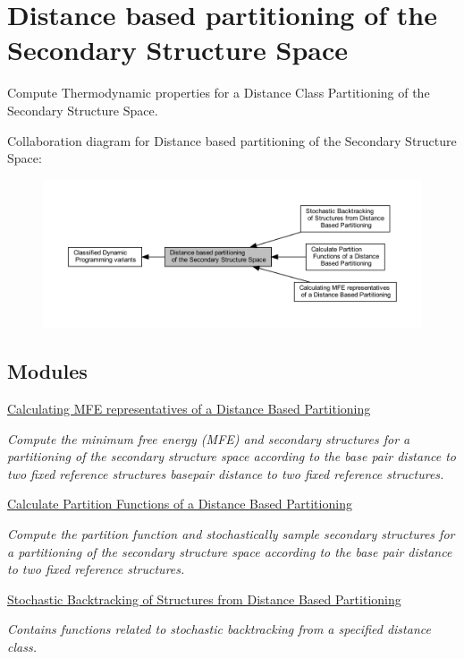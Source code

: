 \hypertarget{group__kl__neighborhood}{}\section{Distance based partitioning of the Secondary Structure Space}
\label{group__kl__neighborhood}


Compute Thermodynamic properties for a Distance Class Partitioning of the Secondary Structure Space.  


Collaboration diagram for Distance based partitioning of the Secondary Structure Space\+:
\nopagebreak
\begin{figure}[H]
\begin{center}
\leavevmode
\includegraphics[width=350pt]{group__kl__neighborhood}
\end{center}
\end{figure}
\subsection*{Modules}
\begin{DoxyCompactItemize}
\item 
\hyperlink{group__kl__neighborhood__mfe}{Calculating M\+F\+E representatives of a Distance Based Partitioning}
\begin{DoxyCompactList}\small\item\em Compute the minimum free energy (M\+FE) and secondary structures for a partitioning of the secondary structure space according to the base pair distance to two fixed reference structures basepair distance to two fixed reference structures. \end{DoxyCompactList}\item 
\hyperlink{group__kl__neighborhood__pf}{Calculate Partition Functions of a Distance Based Partitioning}
\begin{DoxyCompactList}\small\item\em Compute the partition function and stochastically sample secondary structures for a partitioning of the secondary structure space according to the base pair distance to two fixed reference structures. \end{DoxyCompactList}\item 
\hyperlink{group__kl__neighborhood__stochbt}{Stochastic Backtracking of Structures from Distance Based Partitioning}
\begin{DoxyCompactList}\small\item\em Contains functions related to stochastic backtracking from a specified distance class. \end{DoxyCompactList}\end{DoxyCompactItemize}
